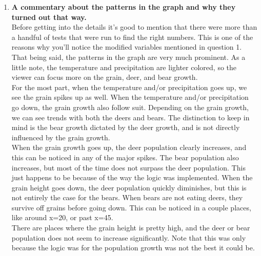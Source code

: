 \documentclass[12pt]{article} %
\begin{document}
\begin{enumerate}
		\item \textbf{A commentary about the patterns in the graph and why they turned out that way.}\\
		Before getting into the details it's good to mention that there were more than a handful of tests that were run to find the right numbers. This is one of the reasons why you'll notice the modified variables mentioned in question 1. That being said, the patterns in the graph are very much prominent. As a little note, the temperature and precipitation are lighter colored, so the viewer can focus more on the grain, deer, and bear growth.\\
		For the most part, when the temperature and/or precipitation goes up, we see the grain spikes up as well. When the temperature and/or precipitation go down, the grain growth also follow suit. Depending on the grain growth, we can see trends with both the deers and bears. The distinction to keep in mind is the bear growth dictated by the deer growth, and is not directly influenced by the grain growth.\\
		When the grain growth goes up, the deer population clearly increases, and this can be noticed in any of the major spikes. The bear population also increases, but most of the time does not surpass the deer population. This just happens to be because of the way the logic was implemented. When the grain height goes down, the deer population quickly diminishes, but this is not entirely the case for the bears. When bears are not eating deers, they survive off grains before going down. This can be noticed in a couple places, like around x=20, or past x=45.\\
		There are places where the grain height is pretty high, and the deer or bear population does not seem to increase significantly. Note that this was only because the logic was for the population growth was not the best it could be. 
	\end{enumerate}
\end{document}
